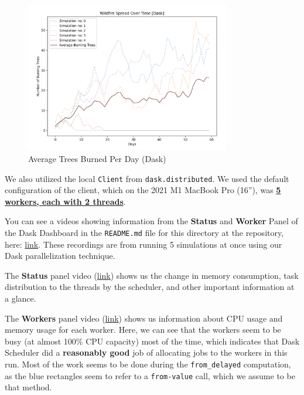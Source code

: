 \documentclass[a4paper,12pt]{article}
\begin{document}
\begin{figure}[H]
  \centering
  \includegraphics[width=0.8\textwidth]{../images/a4_ex1_dask_example.png}
  \caption{Average Trees Burned Per Day (Dask)}
\end{figure}

We also utilized the local \verb|Client| from \verb|dask.distributed|. We used the default configuration of the client, which on the 2021 M1 MacBook Pro (16''), was \textbf{\underline{5 workers, each with 2 threads}}. 

You can see a videos showing information from the \textbf{Status} and \textbf{Worker} Panel of the Dask Dashboard in the \verb|README.md| file for this directory at the repository, here: \href{https://github.com/paulmyr/DD2358-HPC25/tree/master/04_parallel/exercise1#readme}{link}. These recordings are from running 5 simulations at once using our Dask parallelization technique. 

The \textbf{Status} panel video (\href{https://github.com/paulmyr/DD2358-HPC25/tree/master/04_parallel/exercise1#the-status-panel}{link}) shows us the change in memory consumption, task distribution to the threads by the scheduler, and other important information at a glance. 

The \textbf{Workers} panel video (\href{https://github.com/paulmyr/DD2358-HPC25/tree/master/04_parallel/exercise1#the-workers-panel}{link}) shows us information about CPU usage and memory usage for each worker. Here, we can see that the workers seem to be busy (at almost 100\% CPU capacity) most of the time, which indicates that Dask Scheduler did a \textbf{reasonably good} job of allocating jobs to the workers in this run. Most of the work seems to be done during the \verb|from_delayed| computation, as the blue rectangles seem to refer to a \verb|from-value| call, which we assume to be that method. 
\end{document}
